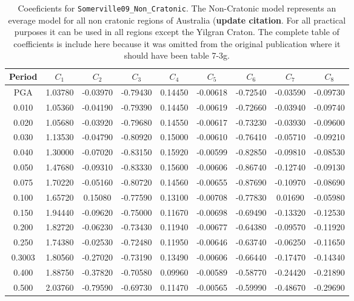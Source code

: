 \begin{table}
\caption{Coeeficients for \texttt{Somerville09\_Non\_Cratonic}. The
Non-Cratonic model represents an everage model for all non cratonic
regions of Australia (\textbf{update citation}. For all practical
purposes it can be used in all regions except the Yilgran Craton.
The complete table of coefficients is include here because it was
omitted from the original publication where it should have been
table 7-3g.} \label{tab:Coeff-Somerville09_Non_Cratonic}
\footnotesize
\begin{tabular}{ccccccccc}
 \hline
Period  & $C_1$    & $C_2$     & $C_3$     & $C_4$     & $C_5$    & $C_6$    & $C_7$    & $C_8$ \\
\hline
PGA     & 1.03780  & -0.03970  & -0.79430  & 0.14450   & -0.00618 & -0.72540 & -0.03590 & -0.09730 \\
0.010   & 1.05360  & -0.04190  & -0.79390  & 0.14450   & -0.00619 & -0.72660 & -0.03940 & -0.09740 \\
0.020   & 1.05680  & -0.03920  & -0.79680  & 0.14550   & -0.00617 & -0.73230 & -0.03930 & -0.09600 \\
0.030   & 1.13530  & -0.04790  & -0.80920  & 0.15000   & -0.00610 & -0.76410 & -0.05710 & -0.09210 \\
0.040   & 1.30000  & -0.07020  & -0.83150  & 0.15920   & -0.00599 & -0.82850 & -0.09810 & -0.08530 \\
0.050   & 1.47680  & -0.09310  & -0.83330  & 0.15600   & -0.00606 & -0.86740 & -0.12740 & -0.09130 \\
0.075   & 1.70220  & -0.05160  & -0.80720  & 0.14560   & -0.00655 & -0.87690 & -0.10970 & -0.08690 \\
0.100   & 1.65720  & 0.15080   & -0.77590  & 0.13100   & -0.00708 & -0.77830 & 0.01690  & -0.05980 \\
0.150   & 1.94440  & -0.09620  & -0.75000  & 0.11670   & -0.00698 & -0.69490 & -0.13320 & -0.12530 \\
0.200   & 1.82720  & -0.06230  & -0.73430  & 0.11940   & -0.00677 & -0.64380 & -0.09570 & -0.11920 \\
0.250   & 1.74380  & -0.02530  & -0.72480  & 0.11950   & -0.00646 & -0.63740 & -0.06250 & -0.11650 \\
0.3003  & 1.80560  & -0.27020  & -0.73190  & 0.13490   & -0.00606 & -0.66440 & -0.17470 & -0.14340 \\
0.400   & 1.88750  & -0.37820  & -0.70580  & 0.09960   & -0.00589 & -0.58770 & -0.24420 & -0.21890 \\
0.500   & 2.03760  & -0.79590  & -0.69730  & 0.11470   & -0.00565 & -0.59990 & -0.48670 & -0.29690 \\

\end{tabular}
\end{table}

